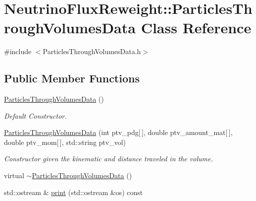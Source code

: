 \hypertarget{class_neutrino_flux_reweight_1_1_particles_through_volumes_data}{\section{Neutrino\-Flux\-Reweight\-:\-:Particles\-Through\-Volumes\-Data Class Reference}
\label{class_neutrino_flux_reweight_1_1_particles_through_volumes_data}
}


{\ttfamily \#include $<$Particles\-Through\-Volumes\-Data.\-h$>$}

\subsection*{Public Member Functions}
\begin{DoxyCompactItemize}
\item 
\hyperlink{class_neutrino_flux_reweight_1_1_particles_through_volumes_data_a76d9b63fcd7df6dd58cc2930c97c30d6}{Particles\-Through\-Volumes\-Data} ()
\begin{DoxyCompactList}\small\item\em Default Constructor. \end{DoxyCompactList}\item 
\hyperlink{class_neutrino_flux_reweight_1_1_particles_through_volumes_data_a88d723bd3f60814f60ca1e662cb61273}{Particles\-Through\-Volumes\-Data} (int ptv\-\_\-pdg\mbox{[}$\,$\mbox{]}, double ptv\-\_\-amount\-\_\-mat\mbox{[}$\,$\mbox{]}, double ptv\-\_\-mom\mbox{[}$\,$\mbox{]}, std\-::string ptv\-\_\-vol)
\begin{DoxyCompactList}\small\item\em Constructor given the kinematic and distance traveled in the volume. \end{DoxyCompactList}\item 
virtual \hyperlink{class_neutrino_flux_reweight_1_1_particles_through_volumes_data_a75fff6e7df3509b1a2e15a53581ae027}{$\sim$\-Particles\-Through\-Volumes\-Data} ()
\item 
std\-::ostream \& \hyperlink{class_neutrino_flux_reweight_1_1_particles_through_volumes_data_a61a5d6880ad08ae17b6b47b645368f00}{print} (std\-::ostream \&os) const 
\end{DoxyCompactItemize}
